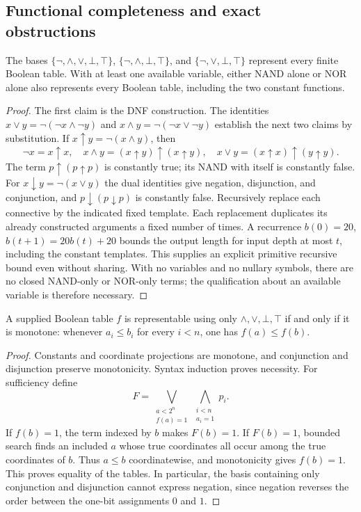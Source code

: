 \subsection{Functional completeness and exact obstructions}

\begin{theorem}\label{ca-bases}
The bases $\{\neg,\wedge,\vee,\bot,\top\}$,
$\{\neg,\wedge,\bot,\top\}$, and $\{\neg,\vee,\bot,\top\}$ represent
every finite Boolean table.  With at least one available variable, either
NAND alone or NOR alone also represents every Boolean table, including the
two constant functions.
\end{theorem}
\begin{proof}
The first claim is the DNF construction.  The identities
$x\vee y=\neg(\neg x\wedge\neg y)$ and
$x\wedge y=\neg(\neg x\vee\neg y)$ establish the next two claims by
substitution.  If $x\mathbin{\uparrow}y=\neg(x\wedge y)$, then
\[
 \neg x=x\mathbin{\uparrow}x,\quad
 x\wedge y=(x\mathbin{\uparrow}y)\mathbin{\uparrow}
              (x\mathbin{\uparrow}y),\quad
 x\vee y=(x\mathbin{\uparrow}x)\mathbin{\uparrow}
              (y\mathbin{\uparrow}y).
\]
The term $p\mathbin{\uparrow}(p\mathbin{\uparrow}p)$ is constantly true;
its NAND with itself is constantly false.  For
$x\mathbin{\downarrow}y=\neg(x\vee y)$ the dual identities give negation,
disjunction, and conjunction, and
$p\mathbin{\downarrow}(p\mathbin{\downarrow}p)$ is constantly false.
Recursively replace each connective by the indicated fixed template.
Each replacement duplicates its already constructed arguments a fixed
number of times.  A recurrence $b(0)=20$,
$b(t+1)=20b(t)+20$ bounds the output length for input depth at most $t$,
including the constant templates.  This supplies an explicit primitive
recursive bound even without sharing.  With no variables and no nullary
symbols, there are no closed NAND-only or NOR-only terms; the qualification
about an available variable is therefore necessary.
\end{proof}

\begin{theorem}\label{ca-monotone}
A supplied Boolean table $f$ is representable using only
$\wedge,\vee,\bot,\top$ if and only if it is monotone: whenever
$a_i\leq b_i$ for every $i<n$, one has $f(a)\leq f(b)$.
\end{theorem}
\begin{proof}
Constants and coordinate projections are monotone, and conjunction and
disjunction preserve monotonicity.  Syntax induction proves necessity.
For sufficiency define
\[
  F=\bigvee_{\substack{a<2^n\\ f(a)=1}}
             \bigwedge_{\substack{i<n\\ a_i=1}}p_i.
\]
If $f(b)=1$, the term indexed by $b$ makes $F(b)=1$.  If $F(b)=1$, bounded
search finds an included $a$ whose true coordinates all occur among the true
coordinates of $b$.  Thus $a\leq b$ coordinatewise, and monotonicity gives
$f(b)=1$.  This proves equality of the tables.  In particular, the basis
containing only conjunction and disjunction cannot express negation, since
negation reverses the order between the one-bit assignments $0$ and $1$.
\end{proof}

